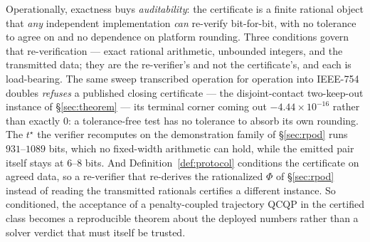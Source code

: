\documentclass[11pt]{article}
\theoremstyle{definition}
\theoremstyle{remark}
\renewcommand{\_}{\ifdim\fontdimen3\font=0pt\relax\char`\_\else\textunderscore\fi\hspace{0pt}}
\begin{document}
Operationally, exactness buys \emph{auditability}: the certificate is a
finite rational object that \emph{any} independent implementation \emph{can}
re-verify bit-for-bit, with no tolerance to agree on and no dependence on
platform rounding. Three conditions govern that re-verification --- exact
rational arithmetic, unbounded integers, and the transmitted data; they are
the re-verifier's and not the certificate's, and each is load-bearing. The
same sweep transcribed operation for operation into IEEE-754 doubles
\emph{refuses} a published closing certificate --- the disjoint-contact
two-keep-out instance of \S\ref{sec:theorem} --- its terminal corner coming
out $-4.44\times10^{-16}$ rather than exactly $0$: a tolerance-free test has
no tolerance to absorb its own rounding. The $t^\star$ the verifier recomputes on the
demonstration family of \S\ref{sec:rpod} runs $931$--$1089$ bits, which no
fixed-width arithmetic can hold, while the emitted pair itself stays at
$6$--$8$ bits. And Definition~\ref{def:protocol} conditions the certificate
on agreed data, so a re-verifier that re-derives the rationalized $\Phi$ of
\S\ref{sec:rpod} instead of reading the transmitted rationals certifies a
different instance. So conditioned, the acceptance of a penalty-coupled
trajectory QCQP in the certified class becomes a reproducible theorem about
the deployed numbers rather than a solver verdict that must itself be
trusted.



\end{document}
